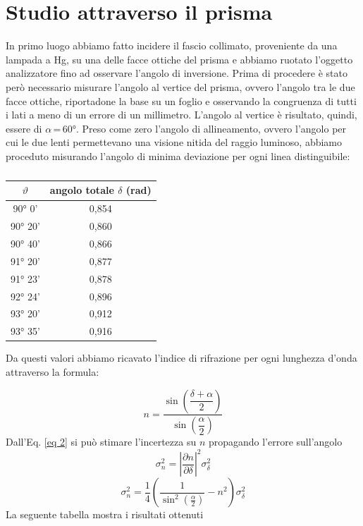 \section{Studio attraverso il prisma}
In primo luogo abbiamo fatto incidere il fascio collimato, proveniente da una lampada a Hg, su una delle facce ottiche del prisma e abbiamo ruotato l'oggetto analizzatore fino ad osservare l'angolo di inversione.
Prima di procedere è stato però necessario misurare l'angolo al vertice del prisma, ovvero l'angolo tra le due facce ottiche, riportadone la base su un foglio e osservando la congruenza di tutti i lati a meno di un errore di un millimetro.
L'angolo al vertice è risultato, quindi, essere di $\alpha$\,=\,60°.
Preso come zero l'angolo di allineamento, ovvero l'angolo per cui le due lenti permettevano una visione nitida del raggio luminoso, abbiamo proceduto misurando l'angolo di minima deviazione per ogni linea distinguibile:

\begin{table}[h!]
    \centering
    \begin{tabular}{cc}
    \toprule
    $\vartheta$ & angolo totale $\delta$ (rad)\\
    \midrule
    90°	0' &0,854\\
    90°	20' &0,860\\
    90°	40' &0,866\\
    91°	20' &0,877\\
    91°	23' &0,878\\
    92°	24' &0,896\\
    93°	20' &0,912\\
    93°	35' &0,916\\
\bottomrule
    \end{tabular}
    \caption{}
    \label{tab:my_label}
\end{table}
\noindent

Da questi valori abbiamo ricavato l'indice di rifrazione per ogni lunghezza d'onda attraverso la formula:

\begin{equation}
n=\dfrac{\sin\left(\dfrac{\delta+\alpha}{2}\right)}{\sin\left(\dfrac{\alpha}{2}\right)}
\label{eq 2}
\end{equation}
Dall'Eq. \ref{eq 2} si può stimare l’incertezza su $n$ propagando l'errore sull'angolo
$$
\sigma^2_n = \left|\dfrac{\partial n}{\partial\delta} \right|^2\sigma^2_{\delta}
$$
\begin{equation}
    \sigma_{n}^{2}=\frac{1}{4}\left(\frac{1}{\sin ^{2}\left(\frac{\alpha}{2}\right)}-n^{2}\right)\sigma_{\delta}^{2}
\end{equation}
La seguente tabella mostra i risultati ottenuti

